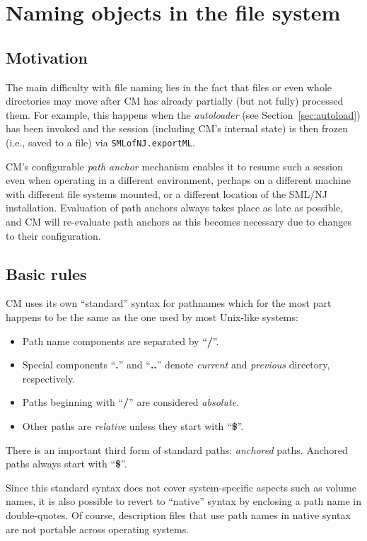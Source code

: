 
\section{Naming objects in the file system}

\subsection{Motivation}

The main difficulty with file naming lies in the fact that files or
even whole directories may move after CM has already partially (but
not fully) processed them.  For example, this happens when the {\em
autoloader} (see Section~\ref{sec:autoload}) has been invoked and the
session (including CM's internal state) is then frozen (i.e., saved to
a file) via {\tt SMLofNJ.exportML}.

CM's configurable {\em path anchor} mechanism enables it to resume
such a session even when operating in a different environment, perhaps
on a different machine with different file systems mounted, or a
different location of the SML/NJ installation.  Evaluation of path
anchors always takes place as late as possible, and CM will re-evaluate
path anchors as this becomes necessary due to changes to their
configuration.

\subsection{Basic rules}
\label{sec:basicrules}

CM uses its own ``standard'' syntax for pathnames which for the most
part happens to be the same as the one used by most Unix-like systems:
\begin{itemize}
\item Path name components are separated by ``{\bf /}''.
\item Special components ``{\bf .}'' and ``{\bf ..}'' denote {\em
current} and {\em previous} directory, respectively.
\item Paths beginning
with ``{\bf /}'' are considered {\em absolute}.
\item Other paths are {\em relative} unless they start with ``{\bf \$}''.
\end{itemize}
\noindent There is an important third form of standard paths: {\em
anchored} paths.  Anchored paths always start with ``{\bf \$}''.

Since this standard syntax does not cover system-specific aspects such
as volume names, it is also possible to revert to ``native'' syntax by
enclosing a path name in double-quotes.  Of course, description files
that use path names in native syntax are not portable across operating
systems.

